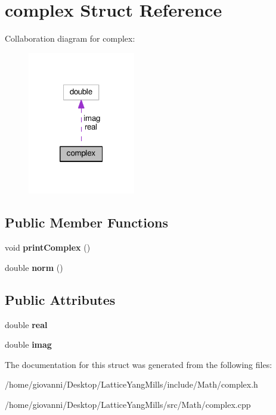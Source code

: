 \hypertarget{structcomplex}{}\section{complex Struct Reference}
\label{structcomplex}


Collaboration diagram for complex\+:
\nopagebreak
\begin{figure}[H]
\begin{center}
\leavevmode
\includegraphics[width=133pt]{structcomplex__coll__graph}
\end{center}
\end{figure}
\subsection*{Public Member Functions}
\begin{DoxyCompactItemize}
\item 
void {\bfseries print\+Complex} ()\hypertarget{structcomplex_aed36e4f758691608576d96ef396cc436}{}\label{structcomplex_aed36e4f758691608576d96ef396cc436}

\item 
double {\bfseries norm} ()\hypertarget{structcomplex_a81dd00af9a4f56a86bd242b31cb1f8a4}{}\label{structcomplex_a81dd00af9a4f56a86bd242b31cb1f8a4}

\end{DoxyCompactItemize}
\subsection*{Public Attributes}
\begin{DoxyCompactItemize}
\item 
double {\bfseries real}\hypertarget{structcomplex_a754edcb8ad10b6b22f6f642089571432}{}\label{structcomplex_a754edcb8ad10b6b22f6f642089571432}

\item 
double {\bfseries imag}\hypertarget{structcomplex_a17e7cf8707199cba0dcd7360dd98aa9f}{}\label{structcomplex_a17e7cf8707199cba0dcd7360dd98aa9f}

\end{DoxyCompactItemize}


The documentation for this struct was generated from the following files\+:\begin{DoxyCompactItemize}
\item 
/home/giovanni/\+Desktop/\+Lattice\+Yang\+Mills/include/\+Math/complex.\+h\item 
/home/giovanni/\+Desktop/\+Lattice\+Yang\+Mills/src/\+Math/complex.\+cpp\end{DoxyCompactItemize}
